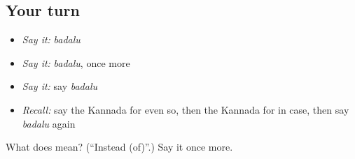 \subsection*{Your turn}
\begin{itemize}
\raggedright
  \item \emph{Say it:} \emph{badalu}
  \item \emph{Say it:} \emph{badalu}, once more
  \item \emph{Say it:} say \emph{badalu}
  \item \emph{Recall:} say the Kannada for even so, then the Kannada for in case, then say \emph{badalu} again
\end{itemize}

\begin{tcolorbox}[breakable,colback=teal!4,colframe=teal!35!black,title={Before you move on}]
What does  mean? (\textquotedblleft{}Instead (of)\textquotedblright{}.) Say it once more.
\end{tcolorbox}

